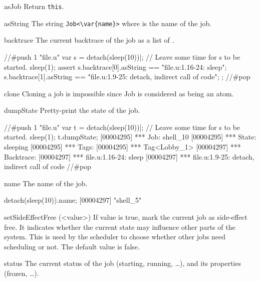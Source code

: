 \begin{urbiscriptapi}
\item[asJob]
  Return \lstinline|this|.

\item[asString] The string \lstinline|Job<\var{name}>| where  is
  the name of the job.

\item[backtrace] The current backtrace of the job as a list of
  .

\begin{urbiscript}
//#push 1 "file.u"
var s = detach(sleep(10))|;
// Leave some time for s to be started.
sleep(1);
assert
{
  s.backtrace[0].asString == "file.u:1.16-24: sleep";
  s.backtrace[1].asString == "file.u:1.9-25: detach, indirect call of code";
};
//#pop
\end{urbiscript}

\item[clone]
  Cloning a job is impossible since Job is considered as being an atom.

\item[dumpState]
  Pretty-print the state of the job.

\begin{urbiscript}
//#push 1 "file.u"
var t = detach(sleep(10))|;
// Leave some time for s to be started.
sleep(1);
t.dumpState;
[00004295] *** Job: shell_10
[00004295] ***   State: sleeping
[00004295] ***   Tags:
[00004295] ***     Tag<Lobby_1>
[00004297] ***   Backtrace:
[00004297] ***     file.u:1.16-24: sleep
[00004297] ***     file.u:1.9-25: detach, indirect call of code
//#pop
\end{urbiscript}

\item[name]  The name of the job.
\begin{urbiscript}
detach(sleep(10)).name;
[00004297] "shell_5"
\end{urbiscript}

\item[setSideEffectFree](<value>)
  If value is true, mark the current job as side-effect free. It indicates
  whether the current state may influence other parts of the system. This is
  used by the scheduler to choose whether other jobs need scheduling or not.
  The default value is false.

\item[status]
  The current status of the job (starting, running, \ldots), and its
  properties (frozen, \ldots).


\end{urbiscriptapi}
